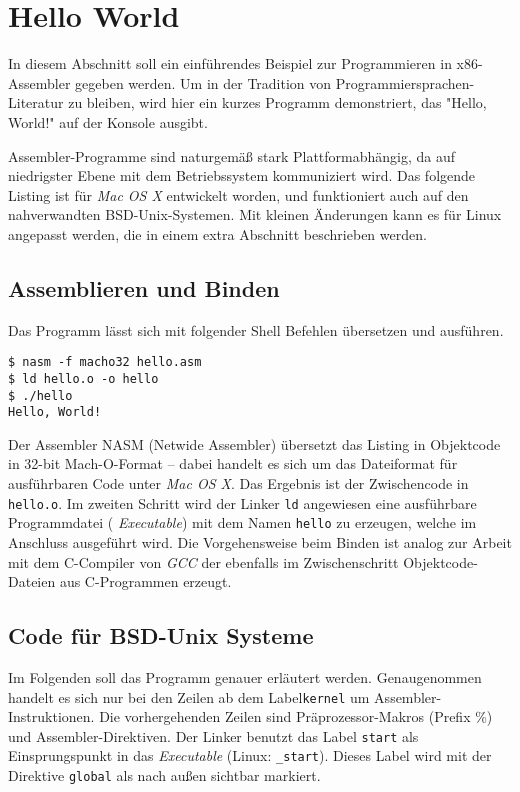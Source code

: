 \section{Hello World}

In diesem Abschnitt soll ein einführendes Beispiel zur Programmieren in x86-Assembler gegeben werden. Um in der Tradition von Programmiersprachen-Literatur zu bleiben, wird hier ein kurzes Programm demonstriert, das "Hello, World!" auf der Konsole ausgibt.

Assembler-Programme sind naturgemäß stark Plattformabhängig, da auf niedrigster Ebene mit dem Betriebssystem kommuniziert wird.
Das folgende Listing ist für \emph{Mac OS X} entwickelt worden, und 
funktioniert auch auf den nahverwandten BSD-Unix-Systemen. Mit kleinen Änderungen kann es für Linux angepasst werden, die in einem extra Abschnitt beschrieben werden.

\subsection{Assemblieren und Binden}

Das Programm lässt sich mit folgender Shell Befehlen übersetzen und ausführen.

\begin{lstlisting}[caption=Assemblieren und Binden von hello.asm]
$ nasm -f macho32 hello.asm
$ ld hello.o -o hello
$ ./hello
Hello, World!
\end{lstlisting}

Der Assembler NASM (Netwide Assembler) übersetzt das Listing in Objektcode in 32-bit Mach-O-Format – dabei handelt es sich um das Dateiformat für ausführbaren Code unter \emph{Mac OS X}. Das Ergebnis ist der Zwischencode in \texttt{hello.o}. Im zweiten Schritt wird der Linker \texttt{ld} angewiesen eine ausführbare Programmdatei (\emph{ Executable}) mit dem Namen \texttt{hello} zu erzeugen, welche im Anschluss ausgeführt wird. Die Vorgehensweise beim Binden ist analog zur Arbeit mit dem C-Compiler von \emph{GCC} der ebenfalls im Zwischenschritt Objektcode-Dateien aus C-Programmen erzeugt.

\subsection{Code für BSD-Unix Systeme}

Im Folgenden soll das Programm genauer erläutert werden. Genaugenommen handelt es sich nur bei den Zeilen ab dem Label\texttt{kernel} um Assembler-Instruktionen. Die vorhergehenden Zeilen sind Präprozessor-Makros (Prefix \%) und Assembler-Direktiven. Der Linker benutzt das Label {\tt start} als Einsprungspunkt in das \emph{Executable} (Linux: {\tt \_start}).
Dieses Label wird mit der Direktive {\tt global} als nach außen sichtbar markiert.


